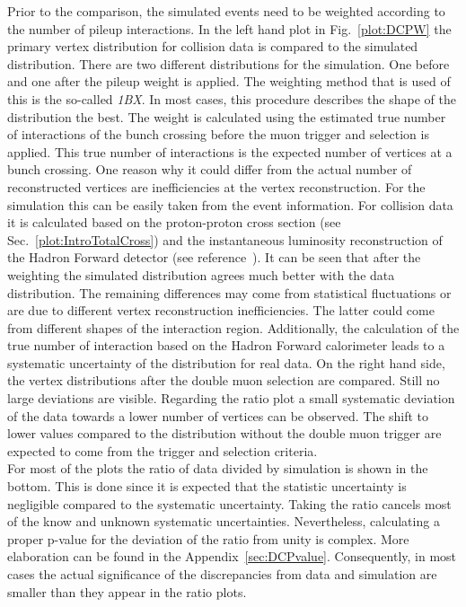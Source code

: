Prior to the comparison, the simulated events need to be weighted according to the number of pileup interactions. In the left hand plot in Fig.~\ref{plot:DCPW} the primary vertex distribution for collision data is compared to the simulated distribution. There are two different distributions for the simulation. One before and one after the pileup weight is applied. The weighting method that is used of this is the so-called \textit{1BX}. In most cases, this procedure describes the shape of the distribution the best. The weight is calculated using the estimated true number of interactions of the bunch crossing before the muon trigger and selection is applied. This true number of interactions is the expected number of vertices at a bunch crossing. One reason why it could differ from the actual number of reconstructed vertices are inefficiencies at the vertex reconstruction. For the simulation this can be easily taken from the event information. For collision data it is calculated based on the proton-proton cross section (see Sec.~\ref{plot:IntroTotalCross}) and the instantaneous luminosity reconstruction of the Hadron Forward detector (see reference~). It can be seen that after the weighting the simulated distribution agrees much better with the data distribution. The remaining differences may come from statistical fluctuations or are due to different vertex reconstruction inefficiencies. The latter could come from different shapes of the interaction region. Additionally, the calculation of the true number of interaction based on the Hadron Forward calorimeter leads to a systematic uncertainty of the distribution for real data. On the right hand side, the vertex distributions after the double muon selection are compared. Still no large deviations are visible. Regarding the ratio plot a small systematic deviation of the data towards a lower number of vertices can be observed.  The shift to lower values compared to the distribution without the double muon trigger are expected to come from the trigger and selection criteria. \\
For most of the plots the ratio of data divided by simulation is shown in the bottom. This is done since it is expected that the statistic uncertainty is negligible compared to the systematic uncertainty. Taking the ratio cancels most of the know and unknown systematic uncertainties. Nevertheless, calculating a proper p-value for the deviation of the ratio from unity is complex. More elaboration can be found in the Appendix~\ref{sec:DCPvalue}. Consequently, in most cases the actual significance of the discrepancies from data and simulation are smaller than they appear in the ratio plots.


